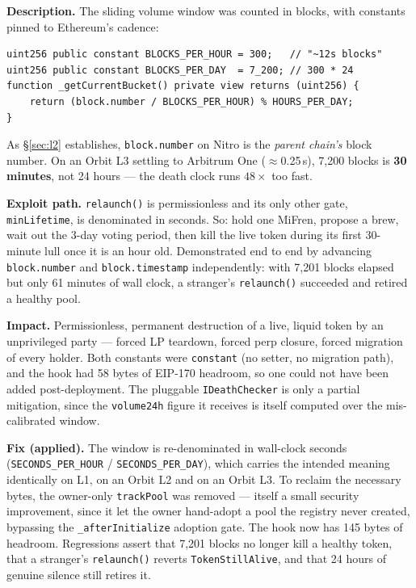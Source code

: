 \documentclass[10pt,a4paper]{article}
\newcommand{\code}[1]{\texttt{\small #1}}
\begin{document}
\textbf{Description.} The sliding volume window was counted in blocks, with constants
pinned to Ethereum's cadence:

\begin{lstlisting}
uint256 public constant BLOCKS_PER_HOUR = 300;   // "~12s blocks"
uint256 public constant BLOCKS_PER_DAY  = 7_200; // 300 * 24
function _getCurrentBucket() private view returns (uint256) {
    return (block.number / BLOCKS_PER_HOUR) % HOURS_PER_DAY;
}
\end{lstlisting}

As \S\ref{sec:l2} establishes, \code{block.number} on Nitro is the \emph{parent chain's}
block number. On an Orbit L3 settling to Arbitrum One ($\approx$0.25\,s), 7{,}200 blocks is
\textbf{30 minutes}, not 24 hours --- the death clock runs $48\times$ too fast.

\textbf{Exploit path.} \code{relaunch()} is permissionless and its only other gate,
\code{minLifetime}, is denominated in seconds. So: hold one MiFren, propose a brew, wait
out the 3-day voting period, then kill the live token during its first 30-minute lull once
it is an hour old. Demonstrated end to end by advancing \code{block.number} and
\code{block.timestamp} independently: with 7{,}201 blocks elapsed but only 61 minutes of
wall clock, a stranger's \code{relaunch()} succeeded and retired a healthy pool.

\textbf{Impact.} Permissionless, permanent destruction of a live, liquid token by an
unprivileged party --- forced LP teardown, forced perp closure, forced migration of every
holder. Both constants were \code{constant} (no setter, no migration path), and the hook
had 58 bytes of EIP-170 headroom, so one could not have been added post-deployment.
The pluggable \code{IDeathChecker} is only a partial mitigation, since the
\code{volume24h} figure it receives is itself computed over the mis-calibrated window.

\textbf{Fix (applied).} The window is re-denominated in wall-clock seconds
(\code{SECONDS\_PER\_HOUR} / \code{SECONDS\_PER\_DAY}), which carries the intended meaning
identically on L1, on an Orbit L2 and on an Orbit L3. To reclaim the necessary bytes, the
owner-only \code{trackPool} was removed --- itself a small security improvement, since it
let the owner hand-adopt a pool the registry never created, bypassing the
\code{\_afterInitialize} adoption gate. The hook now has 145 bytes of headroom.
Regressions assert that 7{,}201 blocks no longer kill a healthy token, that a stranger's
\code{relaunch()} reverts \code{TokenStillAlive}, and that 24 hours of genuine silence
still retires it.
\end{document}
